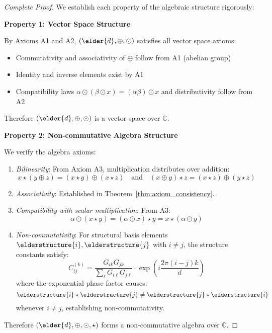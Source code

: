 \begin{proof}[Complete Proof]

We establish each property of the algebraic structure rigorously:

\textbf{Property 1: Vector Space Structure}

By Axioms A1 and A2, $(\elder{d}, \oplus, \odot)$ satisfies all vector space axioms:
\begin{itemize}
\item Commutativity and associativity of $\oplus$ follow from A1 (abelian group)
\item Identity and inverse elements exist by A1
\item Compatibility laws $\alpha \odot (\beta \odot x) = (\alpha\beta) \odot x$ and distributivity follow from A2
\end{itemize}
Therefore $(\elder{d}, \oplus, \odot)$ is a vector space over $\mathbb{C}$.

\textbf{Property 2: Non-commutative Algebra Structure}

We verify the algebra axioms:
\begin{enumerate}
\item \textit{Bilinearity}: From Axiom A3, multiplication distributes over addition:
$$x \star (y \oplus z) = (x \star y) \oplus (x \star z) \quad \text{and} \quad (x \oplus y) \star z = (x \star z) \oplus (y \star z)$$

\item \textit{Associativity}: Established in Theorem~\ref{thm:axiom_consistency}.

\item \textit{Compatibility with scalar multiplication}: From A3:
$$\alpha \odot (x \star y) = (\alpha \odot x) \star y = x \star (\alpha \odot y)$$

\item \textit{Non-commutativity}: For structural basis elements $\elderstructure{i}, \elderstructure{j}$ with $i \neq j$, the structure constants satisfy:
$$C_{ij}^{(k)} = \frac{G_{ik}G_{jk}}{\sum_{\ell} G_{i\ell}G_{j\ell}} \cdot \exp\left(i\frac{2\pi(i-j)k}{d}\right)$$
where the exponential phase factor causes:
$$\elderstructure{i} \star \elderstructure{j} \neq \elderstructure{j} \star \elderstructure{i}$$
whenever $i \neq j$, establishing non-commutativity.
\end{enumerate}

Therefore $(\elder{d}, \oplus, \odot, \star)$ forms a non-commutative algebra over $\mathbb{C}$.


\end{proof}
